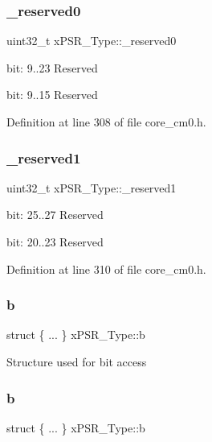\subsubsection{\texorpdfstring{\+\_\+reserved0}{\_reserved0}}
{\footnotesize\ttfamily uint32\+\_\+t x\+P\+S\+R\+\_\+\+Type\+::\+\_\+reserved0}

bit\+: 9..23 Reserved

bit\+: 9..15 Reserved 

Definition at line 308 of file core\+\_\+cm0.\+h.

\mbox{\label{unionx_p_s_r___type_a790056bb6f20ea16cecc784b0dd19ad6}} 
\subsubsection{\texorpdfstring{\+\_\+reserved1}{\_reserved1}}
{\footnotesize\ttfamily uint32\+\_\+t x\+P\+S\+R\+\_\+\+Type\+::\+\_\+reserved1}

bit\+: 25..27 Reserved

bit\+: 20..23 Reserved 

Definition at line 310 of file core\+\_\+cm0.\+h.

\mbox{\label{unionx_p_s_r___type_aac24d2492d64a2f18dce38ad3d5bc6b9}} 
\subsubsection{\texorpdfstring{b}{b}\hspace{0.1cm}{\footnotesize\ttfamily [1/7]}}
{\footnotesize\ttfamily struct \{ ... \}   x\+P\+S\+R\+\_\+\+Type\+::b}

Structure used for bit access \mbox{\label{unionx_p_s_r___type_a3b1063bb5cdad67e037cba993b693b70}} 
\subsubsection{\texorpdfstring{b}{b}\hspace{0.1cm}{\footnotesize\ttfamily [2/7]}}
{\footnotesize\ttfamily struct \{ ... \}   x\+P\+S\+R\+\_\+\+Type\+::b}

